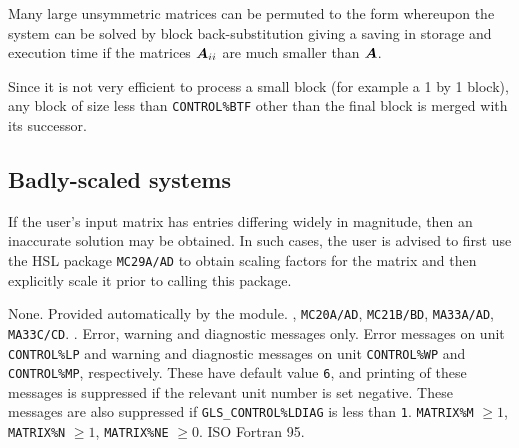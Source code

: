 \documentclass{galahad}
\newcommand{\packagename}{GLS}
\begin{document}
Many large unsymmetric matrices can be permuted to the form
\noindent whereupon the system
can be solved by block back-substitution
giving a saving in storage and execution time if the matrices ${\bm{A}}_{ii}$
are much smaller than ${\bm{A}}$.

\noindent Since it is not very efficient to process a small block (for example
a {1 by 1} block), any block of size less than {\tt CONTROL\%BTF} other than the
final block is merged with its successor. 

\subsection{Badly-scaled systems}

If the user's input matrix has entries differing widely in
magnitude, then an inaccurate solution may be obtained. In such cases,
the user is advised to first use the HSL package {\tt MC29A/AD} to 
obtain scaling factors for the matrix and then explicitly scale it prior 
to calling this package.


\galgeneral

\galcommon None.
\galworkspace Provided automatically by the module.
, 
{\tt MC20A/AD}, {\tt MC21B/BD}, {\tt MA33A/AD}, {\tt MA33C/CD}.
.
\galio 
Error, warning and diagnostic messages only.  Error messages on unit
{\tt CONTROL\%LP} and warning and diagnostic messages on unit 
{\tt CONTROL\%WP} and {\tt CONTROL\%MP}, respectively.  These have default
value {\tt 6}, and printing of these messages is suppressed if the
relevant unit number is set negative.  These messages are also
suppressed if {\tt \packagename\_CONTROL\%LDIAG} is less than {\tt 1}.
\galrestrictions 
{\tt MATRIX\%M} $\geq 1$, {\tt MATRIX\%N} $\geq 1$, {\tt MATRIX\%NE} $\geq 0$.
\galportability ISO Fortran 95.
\end{document}
